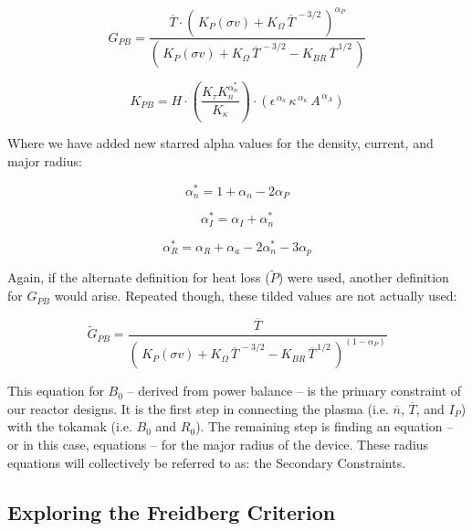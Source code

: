 \begin{equation}
	G_{PB} = \frac{ \overline{T} \cdot \left( \, K_P (\sigma v) + K_\Omega  \, \overline{T}^{  \,-3/2 } \, \right) ^ { \alpha_P } }{ \left( \, K_P (\sigma v) + K_\Omega  \, \overline{T}^{  \,-3/2 } - K_{BR} \, \overline{T}^{  \,1/2 } \, \right) }
\end{equation}

\begin{equation}
	K_{PB} = H \cdot \left( \frac{ K_\tau K_n^{\alpha_n^*}}{K_\kappa } \right) \cdot \left( 
     \epsilon^{\,\alpha_a} \, \kappa^{\,\alpha_\kappa} \, A^{\,\alpha_A}\right)
\end{equation}

Where we have added new starred alpha values for the density, current, and major radius:

\begin{equation}
  \alpha_n^* = 1 + \alpha_n - 2 \alpha_P
\end{equation}

\begin{equation}
  \alpha_I^* = \alpha_I + \alpha_n^*
\end{equation}

\begin{equation}
  \alpha_R^* = \alpha_R + \alpha_a - 2  \alpha_n^* - 3 \alpha_p
\end{equation}

Again, if the alternate definition for heat loss ($\tilde P$) were used, another definition for $G_{PB}$ would arise. Repeated though, these tilded values are not actually used:

\begin{equation}
	\tilde G_{PB} = \frac{ \overline{T} }{ \left( \, K_P (\sigma v) + K_\Omega  \, \overline{T}^{  \,-3/2 } - K_{BR} \, \overline{T}^{  \,1/2 } \, \right) ^ { ( 1 - \alpha_P ) } }
\end{equation}

This equation for $B_0$ -- derived from power balance -- is the primary constraint of our reactor designs. It is the first step in connecting the plasma (i.e. $\overline n$, $\overline T$, and $I_P$) with the tokamak (i.e. $B_0$ and $R_0$). The remaining step is finding an equation -- or in this case, equations -- for the major radius of the device. These radius equations will collectively be referred to as: the Secondary Constraints. 

\subsection{Exploring the Freidberg Criterion}

